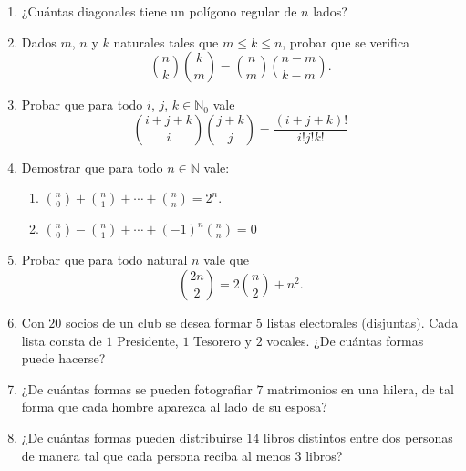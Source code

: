 \documentclass[12pt,spanish,makeidx]{amsbook}
\begin{document}
\begin {enumerate}
\smallskip

\item ¿Cuántas diagonales tiene un polígono regular de $n$ lados?

\smallskip

\item Dados $m$, $n$ y $k$ naturales tales que $m \le k \le n$, probar que se verifica
\[ \binom{n}{k}\binom{k}{m} = \binom{n}{m}\binom{n-m}{k-m}.\]

\smallskip

\item Probar que para todo $i$, $j$, $k \in {\mathbb N}_0$ vale
\[ \binom{i + j + k}{i}\binom{j+k}{j} = \frac{(i+j+k)!}{i!j!k!}\]

\smallskip

\item Demostrar que para todo $n \in \mathbb N$ vale:
\begin{enumerate}
  \item $\displaystyle{\binom{n}{0} + \binom{n}{1} + \cdots + \binom{n}{n} = 2^n}$.
\medskip
  \item $\displaystyle{\binom{n}{0} - \binom{n}{1} + \cdots + (-1)^n\binom{n}{n} = 0}$
  \end{enumerate}

\smallskip

\item Probar que para todo natural $n$ vale que \[\binom{2n}{2} = 2 \binom{n}{2} + n^2.\]

\smallskip



\item Con $20$ socios de un club se desea formar $5$ listas electorales (disjuntas).
Cada lista consta de $1$ Presidente, $1$ Tesorero y $2$ vocales.  ¿De cu\'antas
formas puede hacerse?

\smallskip

\item ¿De cu\'antas formas se pueden fotografiar $7$ matrimonios en una hilera,
de tal forma que cada hombre aparezca al lado de su esposa?

\smallskip

\item ¿De cu\'antas formas pueden distribuirse $14$ libros distintos entre dos
personas de manera tal que cada persona reciba al menos $3$ libros?
\end{enumerate}
\end{document}
